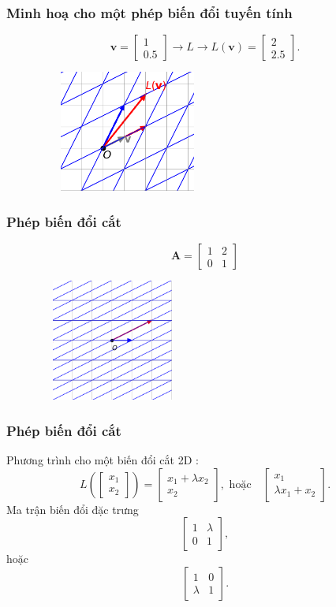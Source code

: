 \begin{frame}
    \frametitle{Minh hoạ cho một phép biến đổi tuyến tính}
    \[\mathbf{v}=\begin{bmatrix}
    1\\0.5
\end{bmatrix}\rightarrow L\rightarrow L(\mathbf{v})=\begin{bmatrix}
    2\\2.5
\end{bmatrix}.\]
    \begin{figure}[H]
        \centering
        \includegraphics[width=6cm, height=4cm]{Slides/Figure/LT2.png}
    \end{figure}
\end{frame}
\begin{frame}
    \frametitle{Phép biến đổi cắt}
    \[\mathbf{A}=\begin{bmatrix}
        1&2\\0&1
    \end{bmatrix}\]
    \begin{figure}
        \centering
        \includegraphics[width=5cm, height=4cm]{Slides/Figure/LT3.png}
    \end{figure}
\end{frame}
\begin{frame}
    \frametitle{Phép biến đổi cắt}
    Phương trình cho một biến đổi cắt 2D :
\[
L\left(\begin{bmatrix}
    x_1 \\x_2
 \end{bmatrix}\right)=\begin{bmatrix}
    x_1 +\lambda x_2 \\x_2
 \end{bmatrix}, \text{ hoặc}\quad 
 \begin{bmatrix}
    x_1 \\\lambda x_1 +x_2
 \end{bmatrix}.\]
Ma trận biến đổi đặc trưng
\[\begin{bmatrix}
    1&\lambda\\0&1
\end{bmatrix},\] hoặc 
\[\begin{bmatrix}
    1&0\\\lambda&1
\end{bmatrix}.\]
\end{frame}
